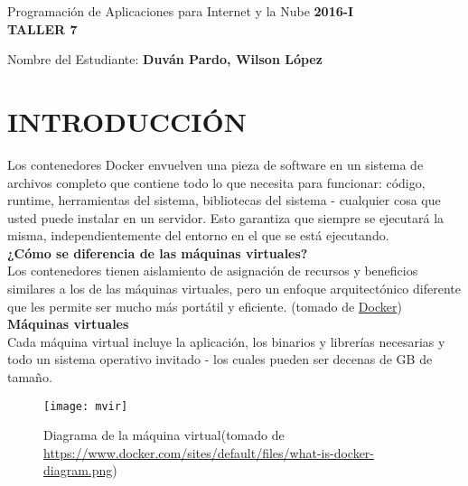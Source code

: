 \documentclass[10pt]{article}   			%
\begin{document}
	\renewcommand{\headrulewidth}{0.5pt}

	\thispagestyle{empty}						%
	\begin{center}
		\large {Programación de Aplicaciones para Internet y la Nube
			\hspace{5 cm}\textbf{2016-I}}
		\bigskip  
		\textbf{
				\LARGE{\\TALLER 7}}\\								%
	\end{center}	
	\begin{flushright}	
		\bigskip	
		Nombre del Estudiante: \textbf{Duván Pardo, Wilson López}			%
	\end{flushright} 
	
\section{INTRODUCCIÓN}	

Los contenedores Docker envuelven una pieza de software en un sistema de archivos completo que contiene todo lo que necesita para funcionar: código, runtime, herramientas del sistema, bibliotecas del sistema - cualquier cosa que usted puede instalar en un servidor. Esto garantiza que siempre se ejecutará la misma, independientemente del entorno en el que se está ejecutando.\\


\textbf{¿Cómo se diferencia de las máquinas virtuales?}\\

Los contenedores tienen aislamiento de asignación de recursos y beneficios similares a los de las máquinas virtuales, pero un enfoque arquitectónico diferente que les permite ser mucho más portátil y eficiente. (tomado de \href{https://www.docker.com/what-docker}{Docker})\\



\textbf{Máquinas virtuales}\\

Cada máquina virtual incluye la aplicación, los binarios y librerías necesarias y todo un sistema operativo invitado - los cuales pueden ser decenas de GB de tamaño. 
		\begin{figure}[ht]
			\centering
			\texttt{[image: mvir]}   
			\caption{Diagrama de la máquina virtual(tomado de \href{https://www.docker.com/sites/default/files/what-is-docker-diagram.png}{https://www.docker.com/sites/default/files/what-is-docker-diagram.png})  } 
		\end{figure}
		
\end{document}
